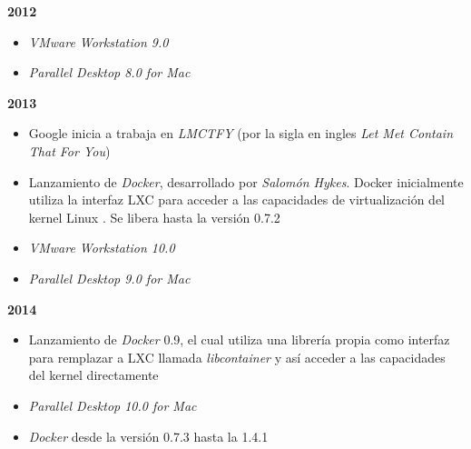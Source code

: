 \textbf{2012}\\
\begin{itemize}
	\item \textit{VMware Workstation 9.0}\\
	
	\item \textit{Parallel Desktop 8.0 for Mac}\\	
\end{itemize}

\textbf{2013}\\

\begin{itemize}
	\item Google inicia a trabaja en \textit{LMCTFY} (por la sigla en ingles \textit{Let Met Contain That For You})\\
	
	\item Lanzamiento de \textit{Docker}, desarrollado por \textit{Salomón Hykes}. Docker inicialmente utiliza la interfaz LXC para acceder a las capacidades de virtualización del kernel Linux \parencite{Turnbull2014}.  Se libera hasta la versión 0.7.2\\
	
	\item \textit{VMware Workstation 10.0}\\
	
	\item \textit{Parallel Desktop 9.0 for Mac}\\	
	
\end{itemize}

\textbf{2014}\\
\begin{itemize}
	\item Lanzamiento de \textit{Docker} 0.9, el cual utiliza una librería propia como interfaz para remplazar a LXC llamada \textit{libcontainer} y así acceder a las capacidades del kernel directamente \parencite{Kurtzer2017}\\
	
	\item \textit{Parallel Desktop 10.0 for Mac}\\	
	
	\item \textit{Docker} desde la versión 0.7.3 hasta la 1.4.1
	
\end{itemize}


